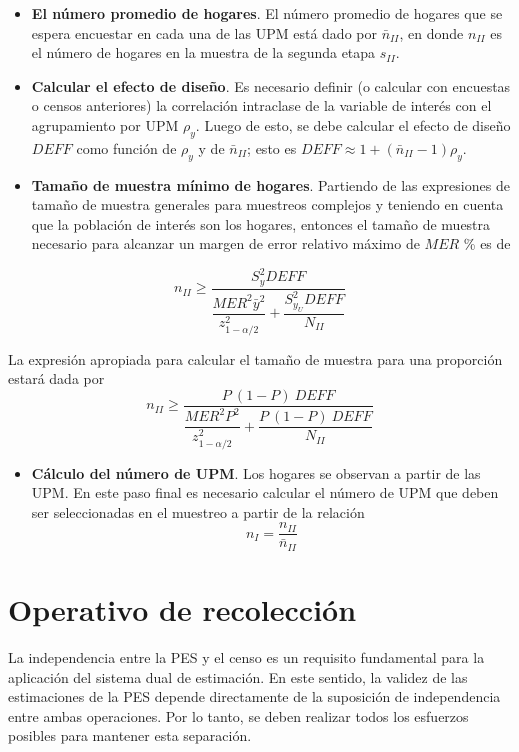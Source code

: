 \documentclass[
  12pt,
]{book}
\providecommand{\tightlist}{%
  \setlength{\itemsep}{0pt}\setlength{\parskip}{0pt}}
\begin{document}
\begin{itemize}
\item
  \textbf{El número promedio de hogares}. El número promedio de hogares que se espera encuestar en cada una de las UPM está dado por \(\bar{n}_{II}\), en donde \(n_{II}\) es el número de hogares en la muestra de la segunda etapa \(s_{II}\).
\item
  \textbf{Calcular el efecto de diseño}. Es necesario definir (o calcular con encuestas o censos anteriores) la correlación intraclase de la variable de interés con el agrupamiento por UPM \(\rho_y\). Luego de esto, se debe calcular el efecto de diseño \(DEFF\) como función de \(\rho_y\) y de \(\bar{n}_{II}\); esto es \(DEFF \approx 1 + (\bar{n}_{II} - 1)\rho_y\).
\item
  \textbf{Tamaño de muestra mínimo de hogares}. Partiendo de las expresiones de tamaño de muestra generales para muestreos complejos y teniendo en cuenta que la población de interés son los hogares, entonces el tamaño de muestra necesario para alcanzar un margen de error relativo máximo de \(MER\) \% es de
\end{itemize}

\[
n_{II} \geq \dfrac{S^2_{y}DEFF}{\dfrac{MER^2 \bar{y}^2}{z_{1-\alpha/2}^2}+\dfrac{S^2_{y_U}DEFF}{N_{II}}}
\]

La expresión apropiada para calcular el tamaño de muestra para una proporción estará dada por
\[
n_{II} \geq \dfrac{P\ (1-P)\ DEFF}{\dfrac{MER^2P^2}{z_{1-\alpha/2}^2}+\dfrac{P\ (1-P) \ DEFF}{N_{II}}}
\]

\begin{itemize}
\tightlist
\item
  \textbf{Cálculo del número de UPM}. Los hogares se observan a partir de las UPM. En este paso final es necesario calcular el número de UPM que deben ser seleccionadas en el muestreo a partir de la relación
  \[
  n_{I} = \frac{n_{II}}{\bar{n}_{II}}
  \]
\end{itemize}

\section{Operativo de recolección}\label{operativo-de-recolecciuxf3n}

La independencia entre la PES y el censo es un requisito fundamental para la aplicación del sistema dual de estimación. En este sentido, la validez de las estimaciones de la PES depende directamente de la suposición de independencia entre ambas operaciones. Por lo tanto, se deben realizar todos los esfuerzos posibles para mantener esta separación.
\end{document}
